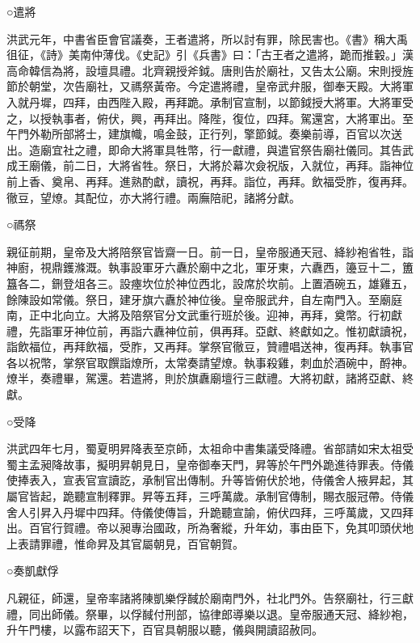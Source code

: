 ○遣將

洪武元年，中書省臣會官議奏，王者遣將，所以討有罪，除民害也。《書》稱大禹徂征，《詩》美南仲薄伐。《史記》引《兵書》曰：「古王者之遣將，跪而推轂。」漢高命韓信為將，設壇具禮。北齊親授斧鉞。唐則告於廟社，又告太公廟。宋則授旌節於朝堂，次告廟社，又禡祭黃帝。今定遣將禮，皇帝武弁服，御奉天殿。大將軍入就丹墀，四拜，由西陛入殿，再拜跪。承制官宣制，以節鉞授大將軍。大將軍受之，以授執事者，俯伏，興，再拜出。降陛，復位，四拜。駕還宮，大將軍出。至午門外勒所部將士，建旗幟，鳴金鼓，正行列，擎節鉞。奏樂前導，百官以次送出。造廟宜社之禮，即命大將軍具牲幣，行一獻禮，與遣官祭告廟社儀同。其告武成王廟儀，前二日，大將省牲。祭日，大將於幕次僉祝版，入就位，再拜。詣神位前上香、奠帛、再拜。進熟酌獻，讀祝，再拜。詣位，再拜。飲福受胙，復再拜。徹豆，望燎。其配位，亦大將行禮。兩廡陪祀，諸將分獻。

○禡祭

親征前期，皇帝及大將陪祭官皆齋一日。前一日，皇帝服通天冠、絳紗袍省牲，詣神廚，視鼎鑊滌溉。執事設軍牙六纛於廟中之北，軍牙東，六纛西，籩豆十二，簠簋各二，鉶登俎各三。設瘞坎位於神位西北，設席於坎前。上置酒碗五，雄雞五，餘陳設如常儀。祭日，建牙旗六纛於神位後。皇帝服武弁，自左南門入。至廟庭南，正中北向立。大將及陪祭官分文武重行班於後。迎神，再拜，奠幣。行初獻禮，先詣軍牙神位前，再詣六纛神位前，俱再拜。亞獻、終獻如之。惟初獻讀祝，詣飲福位，再拜飲福，受胙，又再拜。掌祭官徹豆，贊禮唱送神，復再拜。執事官各以祝幣，掌祭官取饌詣燎所，太常奏請望燎。執事殺雞，刺血於酒碗中，酹神。燎半，奏禮畢，駕還。若遣將，則於旗纛廟壇行三獻禮。大將初獻，諸將亞獻、終獻。

○受降

洪武四年七月，蜀夏明昇降表至京師，太祖命中書集議受降禮。省部請如宋太祖受蜀主孟昶降故事，擬明昇朝見日，皇帝御奉天門，昇等於午門外跪進待罪表。侍儀使捧表入，宣表官宣讀訖，承制官出傳制。升等皆俯伏於地，侍儀舍人掖昇起，其屬官皆起，跪聽宣制釋罪。昇等五拜，三呼萬歲。承制官傳制，賜衣服冠帶。侍儀舍人引昇入丹墀中四拜。侍儀使傳旨，升跪聽宣諭，俯伏四拜，三呼萬歲，又四拜出。百官行賀禮。帝以昶專治國政，所為奢縱，升年幼，事由臣下，免其叩頭伏地上表請罪禮，惟命昇及其官屬朝見，百官朝賀。

○奏凱獻俘

凡親征，師還，皇帝率諸將陳凱樂俘馘於廟南門外，社北門外。告祭廟社，行三獻禮，同出師儀。祭畢，以俘馘付刑部，協律郎導樂以退。皇帝服通天冠、絳紗袍，升午門樓，以露布詔天下，百官具朝服以聽，儀與開讀詔赦同。

